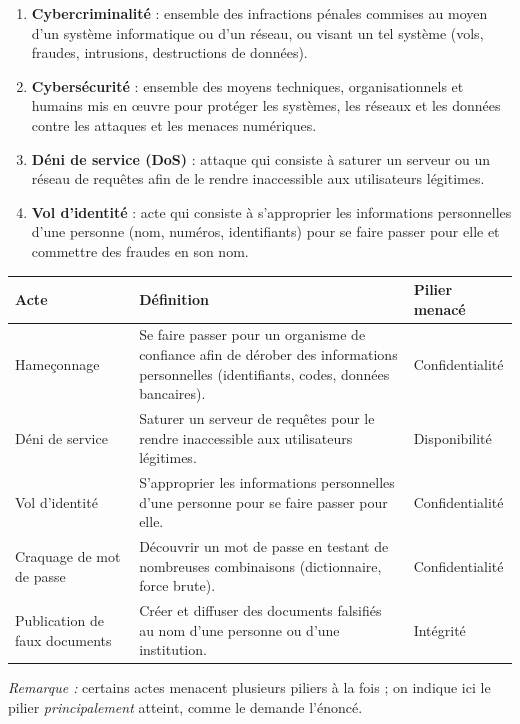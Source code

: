 \documentclass[11pt]{article}
\begin{document}
\begin{corrige}
\begin{enumerate}
\item \textbf{Cybercriminalité} : ensemble des infractions pénales commises au moyen d'un système informatique ou d'un réseau, ou visant un tel système (vols, fraudes, intrusions, destructions de données).
\item \textbf{Cybersécurité} : ensemble des moyens techniques, organisationnels et humains mis en œuvre pour protéger les systèmes, les réseaux et les données contre les attaques et les menaces numériques.
\item \textbf{Déni de service (DoS)} : attaque qui consiste à saturer un serveur ou un réseau de requêtes afin de le rendre inaccessible aux utilisateurs légitimes.
\item \textbf{Vol d'identité} : acte qui consiste à s'approprier les informations personnelles d'une personne (nom, numéros, identifiants) pour se faire passer pour elle et commettre des fraudes en son nom.
\end{enumerate}
\end{corrige}

\begin{corrige}
\begin{center}
\begin{tabularx}{\linewidth}{|l|X|l|}
\hline
\rowcolor{popblueL} \textbf{Acte} & \textbf{Définition} & \textbf{Pilier menacé} \\
\hline
Hameçonnage & Se faire passer pour un organisme de confiance afin de dérober des informations personnelles (identifiants, codes, données bancaires). & Confidentialité \\
\hline
Déni de service & Saturer un serveur de requêtes pour le rendre inaccessible aux utilisateurs légitimes. & Disponibilité \\
\hline
Vol d'identité & S'approprier les informations personnelles d'une personne pour se faire passer pour elle. & Confidentialité \\
\hline
Craquage de mot de passe & Découvrir un mot de passe en testant de nombreuses combinaisons (dictionnaire, force brute). & Confidentialité \\
\hline
Publication de faux documents & Créer et diffuser des documents falsifiés au nom d'une personne ou d'une institution. & Intégrité \\
\hline
\end{tabularx}
\end{center}
\emph{Remarque :} certains actes menacent plusieurs piliers à la fois ; on indique ici le pilier \emph{principalement} atteint, comme le demande l'énoncé.
\end{corrige}
\end{document}
